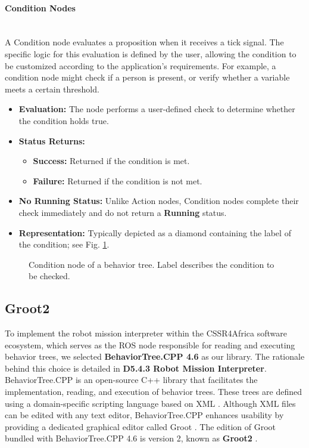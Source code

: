 \documentclass{CSSRforAfrica}
\begin{document}
\paragraph{Condition Nodes}~\\
A Condition node evaluates a proposition when it receives a tick signal. The specific logic for this evaluation is defined by the user, allowing the condition to be customized according to the application’s requirements. For example, a condition node might check if a person is present, or verify whether a variable meets a certain threshold.
\begin{itemize}
    \item \textbf{Evaluation:} The node performs a user-defined check to determine whether the condition holds true.
    \item \textbf{Status Returns:}
    \begin{itemize}
        \item \textbf{Success:} Returned if the condition is met.
        \item \textbf{Failure:} Returned if the condition is not met.
    \end{itemize}
    \item \textbf{No Running Status:} Unlike Action nodes, Condition nodes complete their check immediately and do not return a \textbf{Running} status.
    \item \textbf{Representation:} Typically depicted as a diamond containing the label of the condition; see Fig. \ref{fig:condition}.     
\end{itemize}

    \begin{figure}[h]
        \centering
        \caption{Condition node of a behavior tree. Label describes the condition to be checked.}
        \label{fig:condition}
    \end{figure}


\subsection{Groot2}
\label{section:groot}

To implement the robot mission interpreter within the CSSR4Africa software ecosystem, which serves as the ROS node responsible for reading and executing behavior trees, we selected \textbf{BehaviorTree.CPP 4.6} as our library. The rationale behind this choice is detailed in \textbf{D5.4.3 Robot Mission Interpreter}. BehaviorTree.CPP is an open-source C++ library that facilitates the implementation, reading, and execution of behavior trees. These trees are defined using a domain-specific scripting language based on XML \cite{Ghzoulietal2023}. Although XML files can be edited with any text editor, BehaviorTree.CPP enhances usability by providing a dedicated graphical editor called Groot \cite{DortmansPunter2022}. The edition of Groot bundled with BehaviorTree.CPP 4.6 is version 2, known as \textbf{Groot2} \cite{BehaviorTreeWebsite}.
\end{document}
